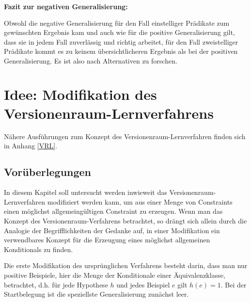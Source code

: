 \documentclass[a4paper, 11pt]{book}
\begin{document}
\textbf{{\large Fazit zur negativen Generalisierung:}} \label{Fazit neg Gen} 

\noindent
Obwohl die negative Generalisierung für den Fall einstelliger Prädikate zum gewünschten Ergebnis kam und auch wie für die positive Generalisierung gilt, dass sie in jedem Fall zuverlässig und richtig arbeitet, für den Fall zweistelliger Prädikate kommt es zu keinem übersichtlicheren Ergebnis als bei der positiven Generalisierung. Es ist also nach Alternativen zu forschen.


	\section{Idee: Modifikation des Versionenraum-Lernverfahrens} \label{Verwendbar VRL} 
	Nähere Ausführungen zum Konzept des Versionenraum-Lernverfahren finden sich in Anhang \ref{VRL}.\\
	\subsection{Vorüberlegungen}
	In diesem Kapitel soll untersucht werden inwieweit das Versionenraum-Lernverfahren modifiziert werden kann, um aus einer Menge von Constraints einen möglichst allgemeingültigen Constraint zu erzeugen. Wenn man das Konzept des Versionenraum-Verfahrens betrachtet, so drängt sich allein durch die Analogie der Begrifflichkeiten der Gedanke auf, in einer Modifikation ein verwendbares Konzept für die Erzeugung eines möglichst allgemeinen Konditionals zu finden.
	
	Die erste Modifikation des ursprünglichen Verfahrens besteht darin, dass man nur positive Beispiele, hier die Menge der Konditionale einer Äquivalenzklasse, betrachtet, d.h. für jede Hypothese $ h $ und jedes Beispiel $ e $ gilt $ h(e) = 1 $.
	Bei der Startbelegung ist die speziellste Generalisierung zunächst leer. 
\end{document}
